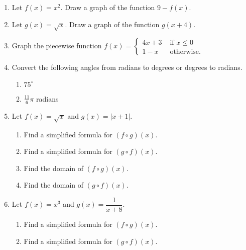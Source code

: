 \documentclass[11pt]{article}
\newcommand{\ds}{\displaystyle}
\begin{document}
\begin{enumerate}
\setcounter{enumi}{\theenumCount}
\item Let $f(x) = x^2$. Draw a graph of the function $9-f(x)$. 
\vfill
\vfill

\item Let $g(x) = \sqrt{x}$. Draw a graph of the function $g(x+4)$.  
\vfill
\vfill

\item Graph the piecewise function $\ds f(x) = \begin{cases} 
4x+3 & \text{ if } x \le 0 \\
1-x & \text{ otherwise.}
\end{cases}$
\vfill

\item Convert the following angles from radians to degrees or degrees to radians.
\begin{multicols}{2}
\begin{enumerate}
\item $75^\circ$
\item $\tfrac{11}{6} \pi$ radians
\end{enumerate}
\end{multicols}
\vfill


\newpage
\item Let $f(x) = \sqrt{x}$ and $g(x) = |x+1|$.
\begin{multicols}{2}
\begin{enumerate}
\item Find a simplified formula for $(f \circ g)(x)$.
\item Find a simplified formula for $(g \circ f)(x)$.
\end{enumerate}
\end{multicols}
\vfill

\begin{multicols}{2}
\begin{enumerate}
\setcounter{enumii}{2}
\item Find the domain of $(f \circ g)(x)$.
\item Find the domain of $(g \circ f)(x)$.
\end{enumerate}
\end{multicols}
\vfill


\item Let $f(x) = x^3$ and $g(x) = \dfrac{1}{x+8}$.
\begin{multicols}{2}
\begin{enumerate}
\item Find a simplified formula for $(f \circ g)(x)$.
\item Find a simplified formula for $(g \circ f)(x)$.
\end{enumerate}
\end{multicols}
\vfill


\end{enumerate}
\end{document}
